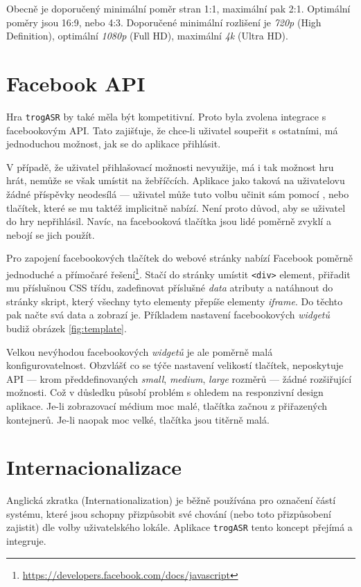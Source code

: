 Obecně je doporučený minimální poměr stran 1:1, maximální pak 2:1. Optimální poměry jsou 16:9, nebo 4:3. Doporučené minimální rozlišení je {\sl 720p } (High Definition), optimální {\sl 1080p } (Full HD), maximální {\sl 4k } (Ultra HD).

\section{Facebook API}

Hra \verb|trogASR| by také měla být kompetitivní. Proto byla zvolena integrace s facebookovým API. Tato zajišťuje, že chce-li uživatel soupeřit s ostatními, má jednoduchou možnost, jak se do aplikace přihlásit.

V případě, že uživatel přihlašovací možnosti nevyužije, má i tak možnost hru hrát, nemůže se však umístit na žebříčcích. Aplikace jako taková na uživatelovu  žádné příspěvky neodesílá --- uživatel může tuto volbu učinit sám pomocí , nebo  tlačítek, které se mu taktéž implicitně nabízí. Není proto důvod, aby se uživatel do hry nepřihlásil. Navíc, na facebooková tlačítka jsou lidé poměrně zvyklí a nebojí se jich použít.

Pro zapojení facebookových tlačítek do webové stránky nabízí Facebook poměrně jednoduché a přímočaré řešení\footnote{\url{https://developers.facebook.com/docs/javascript}}. Stačí do stránky umístit \verb|<div>| element, přiřadit mu příslušnou CSS třídu, zadefinovat příslušné {\sl data} atributy a natáhnout do stránky skript, který všechny tyto elementy přepíše elementy {\sl iframe}. Do těchto pak načte svá data a zobrazí je. Příkladem nastavení facebookových {\sl widgetů} budiž obrázek \ref{fig:template}.

Velkou nevýhodou facebookových {\sl widgetů} je ale poměrně malá konfigurovatelnost. Obzvlášť co se týče nastavení velikostí tlačítek, neposkytuje API --- krom předdefinovaných {\sl small}, {\sl medium}, {\sl large} rozměrů --- žádné rozšiřující možnosti. Což v důsledku působí problém s ohledem na responzivní design aplikace. Je-li zobrazovací médium moc malé, tlačítka začnou  z přiřazených kontejnerů. Je-li naopak moc velké, tlačítka jsou titěrně malá.

\section{Internacionalizace}

Anglická zkratka  (Internationalization) je běžně používána pro označení částí systému, které jsou schopny přizpůsobit své chování (nebo toto přizpůsobení zajistit) dle volby uživatelského lokále. Aplikace \verb|trogASR| tento koncept přejímá a integruje.

